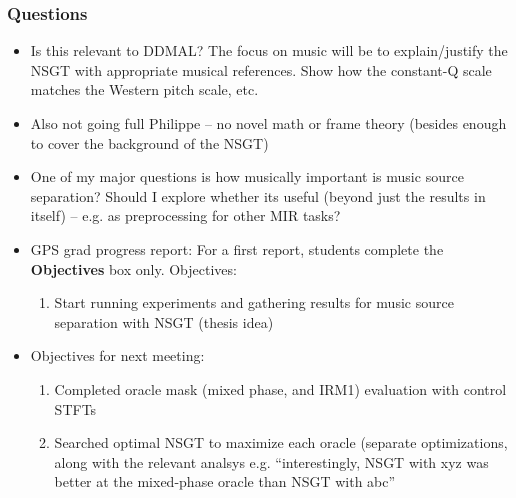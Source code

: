 \documentclass[usenames,dvipsnames]{beamer}
\begin{document}
\begin{frame}
	\frametitle{Questions}
	\begin{itemize}
		\item
			Is this relevant to DDMAL? The focus on music will be to explain/justify the NSGT with appropriate musical references. Show how the constant-Q scale matches the Western pitch scale, etc.
		\item
			Also not going full Philippe -- no novel math or frame theory (besides enough to cover the background of the NSGT)
		\item
			One of my major questions is how musically important is music source separation? Should I explore whether its useful (beyond just the results in itself) -- e.g. as preprocessing for other MIR tasks?
		\item
			GPS grad progress report: For a first report, students complete the \textbf{Objectives} box only.
			Objectives:
			\begin{enumerate}
				\item
					Start running experiments and gathering results for music source separation with NSGT (thesis idea)
			\end{enumerate}
		\item
			Objectives for next meeting:\\
			\begin{enumerate}
				\item
					Completed oracle mask (mixed phase, and IRM1) evaluation with control STFTs
				\item
					Searched optimal NSGT to maximize each oracle (separate optimizations, along with the relevant analsys e.g. ``interestingly, NSGT with xyz was better at the mixed-phase oracle than NSGT with abc''
			\end{enumerate}
	\end{itemize}
\end{frame}
\end{document}
